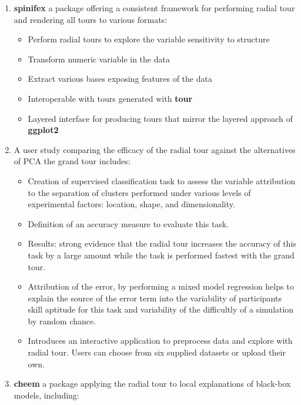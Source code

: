 \documentclass{template/monashthesis}
\begin{document}
\begin{enumerate}
\def\labelenumi{\arabic{enumi}.}
\tightlist
\item
  \textbf{spinifex} a package offering a consistent framework for performing radial tour and rendering all tours to various formats:

  \begin{itemize}
  \tightlist
  \item
    Perform radial tours to explore the variable sensitivity to structure
  \item
    Transform numeric variable in the data
  \item
    Extract various bases exposing features of the data
  \item
    Interoperable with tours generated with \textbf{tour} \autocite{wickham_tourr:_2011}
  \item
    Layered interface for producing tours that mirror the layered approach of \textbf{ggplot2} \autocite{wickham_ggplot2_2016}
  \end{itemize}
\item
  A user study comparing the efficacy of the radial tour against the alternatives of PCA the grand tour includes:

  \begin{itemize}
  \tightlist
  \item
    Creation of supervised classification task to assess the variable attribution to the separation of clusters performed under various levels of experimental factors: location, shape, and dimensionality.
  \item
    Definition of an accuracy measure to evaluate this task.
  \item
    Results: strong evidence that the radial tour increases the accuracy of this task by a large amount while the task is performed fastest with the grand tour.
  \item
    Attribution of the error, by performing a mixed model regression helps to explain the source of the error term into the variability of participants skill aptitude for this task and variability of the difficultly of a simulation by random chance.
  \item
    Introduces an interactive application to preprocess data and explore with radial tour. Users can choose from six supplied datasets or upload their own.
  \end{itemize}
\item
  \textbf{cheem} a package applying the radial tour to local explanations of black-box models, including:


\end{enumerate}
\end{document}
